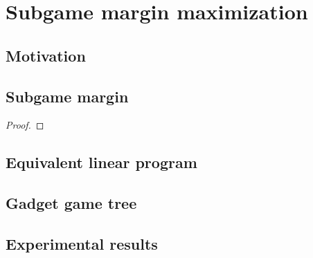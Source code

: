 \chapter{Subgame margin maximization}

\section{Motivation}

\section{Subgame margin}

\begin{defn}
\end{defn}

\begin{thm}
  \todo
\end{thm}

\begin{proof}
  \todo
\end{proof}

\section{Equivalent linear program}

\section{Gadget game tree}

\section{Experimental results}
